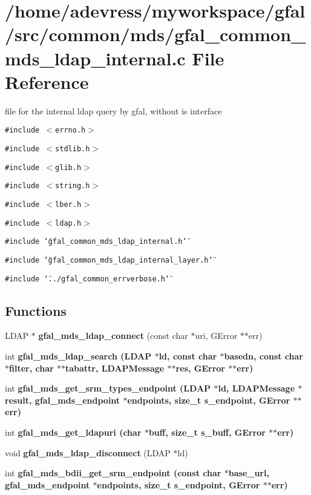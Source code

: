 \section{/home/adevress/myworkspace/gfal/src/common/mds/gfal\_\-common\_\-mds\_\-ldap\_\-internal.c File Reference}
\label{gfal__common__mds__ldap__internal_8c}
file for the internal ldap query by gfal, without is interface 

{\tt \#include $<$errno.h$>$}\par
{\tt \#include $<$stdlib.h$>$}\par
{\tt \#include $<$glib.h$>$}\par
{\tt \#include $<$string.h$>$}\par
{\tt \#include $<$lber.h$>$}\par
{\tt \#include $<$ldap.h$>$}\par
{\tt \#include \char`\"{}gfal\_\-common\_\-mds\_\-ldap\_\-internal.h\char`\"{}}\par
{\tt \#include \char`\"{}gfal\_\-common\_\-mds\_\-ldap\_\-internal\_\-layer.h\char`\"{}}\par
{\tt \#include \char`\"{}../gfal\_\-common\_\-errverbose.h\char`\"{}}\par
\subsection*{Functions}
\begin{CompactItemize}
\item 
LDAP $\ast$ \textbf{gfal\_\-mds\_\-ldap\_\-connect} (const char $\ast$uri, GError $\ast$$\ast$err)\label{gfal__common__mds__ldap__internal_8c_22cdd368742233b06e12153471ffbb6f}

\item 
int \bf{gfal\_\-mds\_\-ldap\_\-search} (LDAP $\ast$ld, const char $\ast$basedn, const char $\ast$filter, char $\ast$$\ast$tabattr, LDAPMessage $\ast$$\ast$res, GError $\ast$$\ast$err)
\item 
int \bf{gfal\_\-mds\_\-get\_\-srm\_\-types\_\-endpoint} (LDAP $\ast$ld, LDAPMessage $\ast$result, gfal\_\-mds\_\-endpoint $\ast$endpoints, size\_\-t s\_\-endpoint, GError $\ast$$\ast$err)
\item 
int \bf{gfal\_\-mds\_\-get\_\-ldapuri} (char $\ast$buff, size\_\-t s\_\-buff, GError $\ast$$\ast$err)
\item 
void \textbf{gfal\_\-mds\_\-ldap\_\-disconnect} (LDAP $\ast$ld)\label{gfal__common__mds__ldap__internal_8c_6faad786f3e54dba0b195be6d3d37268}

\item 
int \bf{gfal\_\-mds\_\-bdii\_\-get\_\-srm\_\-endpoint} (const char $\ast$base\_\-url, gfal\_\-mds\_\-endpoint $\ast$endpoints, size\_\-t s\_\-endpoint, GError $\ast$$\ast$err)
\end{CompactItemize}


